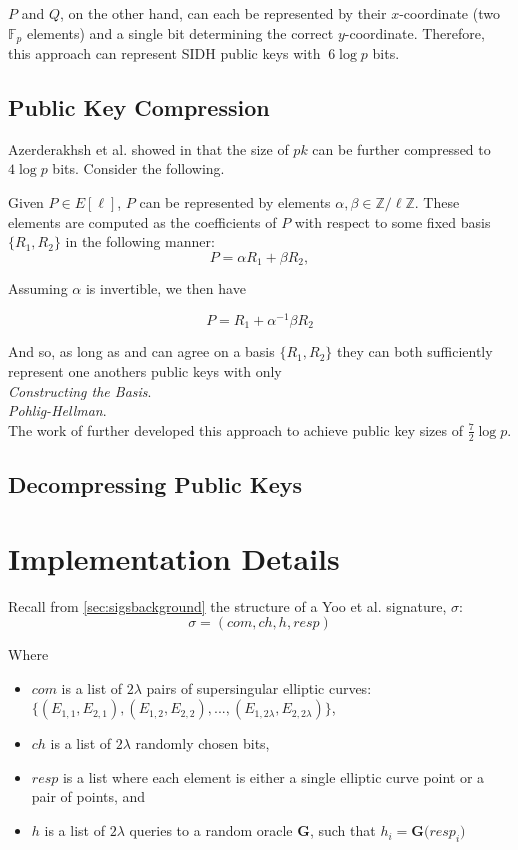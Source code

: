 $P$ and $Q$, on the other hand, can each be represented by their $x$-coordinate (two $\mathbb{F}_{p}$ elements) and a single bit determining the correct $y$-coordinate. Therefore, this approach can represent SIDH public keys with $~6\log p$ bits.

\subsection{Public Key Compression}

Azerderakhsh et al. showed in \cite{compwr} that the size of $pk$ can be further compressed to $4\log p$ bits. Consider the following.

Given $P \in E[\ell]$, $P$ can be represented by elements $\alpha, \beta \in \mathbb{Z}/\ell\mathbb{Z}$. These elements are computed as the coefficients of $P$ with respect to some fixed basis $\{R_1, R_2\}$ in the following manner: 
$$
P = \alpha R_1 + \beta R_2,
$$

Assuming $\alpha$ is invertible, we then have

$$
P = R_1 + \alpha^{-1}\beta R_2
$$

And so, as long as \alice and \bob can agree on a basis $\{R_1, R_2\}$ they can both sufficiently represent one anothers public keys with only\\

\noindent
\textit{Constructing the Basis}.\\

\noindent
\textit{Pohlig-Hellman}.\\

The work of \cite{pkcomp} further developed this approach to achieve public key sizes of $\frac{7}{2}\log p$. 



\subsection{Decompressing Public Keys}


\section{Implementation Details}
\label{sec:compimplementation}

Recall from \ref{sec:sigsbackground} the structure of a Yoo et al. signature, $\sigma$:
$$
\sigma = (com, ch, h, resp)
$$

\noindent
Where

\begin{itemize}
\item $com$ is a list of $2\lambda$ pairs of supersingular elliptic curves: $\{(E_{1,1}, E_{2,1}), (E_{1,2}, E_{2,2}), ..., (E_{1,2\lambda}, E_{2,2\lambda})\}$,
\item $ch$ is a list of $2\lambda$ randomly chosen bits,
\item $resp$ is a list where each element is either a single elliptic curve point or a pair of points, and
\item $h$ is a list of $2\lambda$ queries to a random oracle \textbf{G}, such that $h_{i} = \textbf{G(}resp_{i}\textbf{)}$
\end{itemize}

